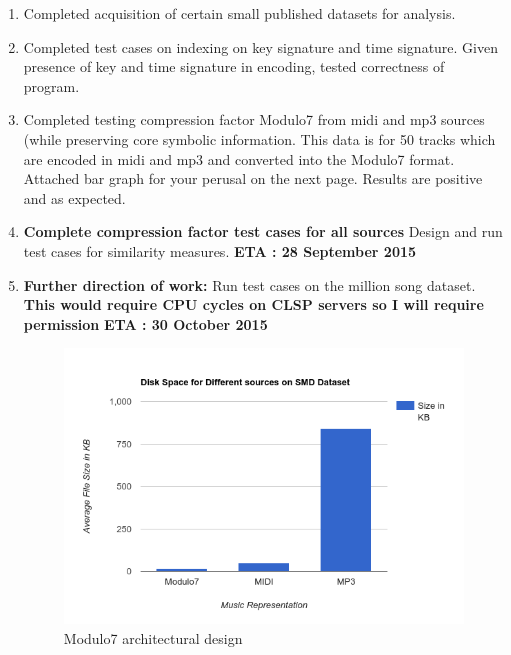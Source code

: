 \documentclass[11pt]{article}
\begin{document}
\begin{enumerate}
\item Completed acquisition of certain small published datasets for analysis.
\item Completed test cases on indexing on key signature and time signature. Given presence of key and time signature in encoding, tested correctness of program.
\item Completed testing compression factor Modulo7 from midi and mp3 sources (while preserving core symbolic information. This data is for 50 tracks which are encoded in midi and mp3 and converted into the Modulo7 format. Attached bar graph for your perusal on the next page. Results are positive and as expected. 
\item \textbf{Complete compression factor test cases for all sources} Design and run test cases for similarity measures. \textbf{ETA : 28 September 2015}
\item \textbf{Further direction of work:} Run test cases on the million song dataset. 
\textbf{This would require CPU cycles on CLSP servers so I will require permission} \textbf{ETA : 30 October 2015}
 
\begin{figure}
\centering
\includegraphics[width=\textwidth]{Modulo7SMDBarGraph.png}
\makeatletter
\let\@currsize\normalsize
\caption{Modulo7 architectural design}
\label{fig:figure}
\end{figure}


\end{enumerate}
\end{document}
